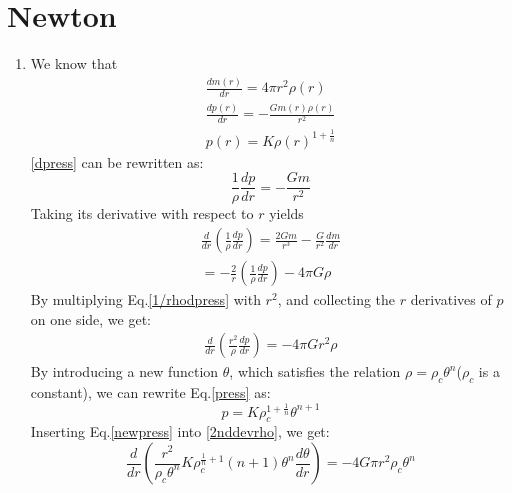 \documentclass[a4paper]{article}
\begin{document}
 \lfoot{} \rfoot{\bf \thepage} \cfoot{} 

\section{Newton}

\begin{enumerate}[label=(\alph*)]
    \item We know that \\
    \begin{align}
        \frac{dm(r)}{dr} = 4\pi r^{2}\rho(r)\label{dmass}    \\
        \frac{dp(r)}{dr} = -\frac{Gm(r)\rho(r)}{r^{2}}\label{dpress}  \\
        p(r) = K{\rho(r)}^{1+\frac{1}{n}}\label{press} 
    \end{align}
    \eqref{dpress} can be rewritten as:
    \begin{equation}
      \frac{1}{\rho}\frac{dp}{dr} = -\frac{Gm}{r^{2}}
    \end{equation}
    Taking its derivative with respect to $r$ yields
    \begin{align}
        \frac{d}{dr}\left(\frac{1}{\rho}\frac{dp}{dr}\right) = \frac{2Gm}{r^{3}} - \frac{G}{r^{2}}\frac{dm}{dr}    \nonumber \\
        =-\frac{2}{r}\left(\frac{1}{\rho}\frac{dp}{dr}\right) - 4\pi G\rho \label{1/rhodpress}
    \end{align}
    By multiplying Eq.\eqref{1/rhodpress} with $r^{2}$, and collecting the $r$ derivatives of $p$ on one side, we get:
    \begin{align}
        \frac{d}{dr}\left(\frac{r^{2}}{\rho}\frac{dp}{dr}\right) = -4\pi Gr^{2}\rho \label{2nddevrho}
    \end{align}
     By introducing a new function $\theta$, which satisfies the relation $\rho = \rho_{c}\theta^{n}$($\rho_{c}$ is a constant), we can rewrite Eq.\eqref{press} as:
    \begin{equation}
        p = K  \rho_{c}^{1+\frac{1}{n}}\theta^{n+1} \label{newpress}
    \end{equation}
    Inserting Eq.\eqref{newpress} into \eqref{2nddevrho}, we get:
    \begin{equation}
        \frac{d}{dr}\left(\frac{r^{2}}{\rho_{c}\theta^{n}}K\rho_{c}^{\frac{1}{n} + 1}(n+1)\theta^{n} \frac{d\theta}{dr}\right) = -4G\pi r^{2}\rho_{c}\theta^{n}
    \end{equation}

\end{enumerate}
\end{document}
